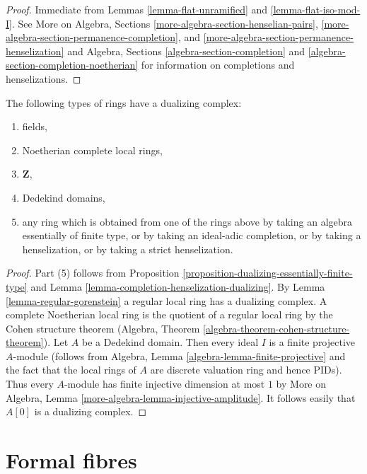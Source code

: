 \begin{proof}
Immediate from Lemmas \ref{lemma-flat-unramified} and
\ref{lemma-flat-iso-mod-I}.
See More on Algebra, Sections \ref{more-algebra-section-henselian-pairs},
\ref{more-algebra-section-permanence-completion}, and
\ref{more-algebra-section-permanence-henselization} and
Algebra, Sections \ref{algebra-section-completion} and
\ref{algebra-section-completion-noetherian}
for information on completions and henselizations.
\end{proof}

\begin{lemma}
\label{lemma-ubiquity-dualizing}
The following types of rings have a dualizing complex:
\begin{enumerate}
\item fields,
\item Noetherian complete local rings,
\item $\mathbf{Z}$,
\item Dedekind domains,
\item any ring which is obtained from one of the rings above by
taking an algebra essentially of finite type, or by taking an
ideal-adic completion, or by taking a henselization, 
or by taking a strict henselization.
\end{enumerate}
\end{lemma}

\begin{proof}
Part (5) follows from Proposition
\ref{proposition-dualizing-essentially-finite-type}
and Lemma \ref{lemma-completion-henselization-dualizing}.
By Lemma \ref{lemma-regular-gorenstein} a regular local ring has a
dualizing complex.
A complete Noetherian local ring is the quotient of a regular
local ring by the Cohen structure theorem
(Algebra, Theorem \ref{algebra-theorem-cohen-structure-theorem}).
Let $A$ be a Dedekind domain. Then every ideal $I$ is a finite
projective $A$-module (follows from
Algebra, Lemma \ref{algebra-lemma-finite-projective}
and the fact that the local rings of $A$ are discrete valuation ring
and hence PIDs). Thus every $A$-module has finite injective dimension
at most $1$ by
More on Algebra, Lemma \ref{more-algebra-lemma-injective-amplitude}.
It follows easily that $A[0]$ is a dualizing complex.
\end{proof}





\section{Formal fibres}
\label{section-formal-fibres}

